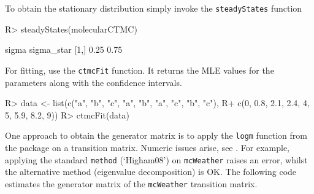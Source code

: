 \documentclass[
  nojss]{jss}
\begin{document}
To obtain the stationary distribution simply invoke the \texttt{steadyStates} function

\begin{CodeChunk}

\begin{CodeInput}
R> steadyStates(molecularCTMC)
\end{CodeInput}

\begin{CodeOutput}
     sigma sigma_star
[1,]  0.25       0.75
\end{CodeOutput}
\end{CodeChunk}

For fitting, use the \texttt{ctmcFit} function. It returns the MLE values for the parameters along with the confidence intervals.

\begin{CodeChunk}

\begin{CodeInput}
R> data <- list(c("a", "b", "c", "a", "b", "a", "c", "b", "c"), 
R+              c(0, 0.8, 2.1, 2.4, 4, 5, 5.9, 8.2, 9))
R> ctmcFit(data)
\end{CodeInput}

\end{CodeChunk}

One approach to obtain the generator matrix is to apply the \texttt{logm} function from the  package on a transition matrix. Numeric issues arise, see \cite{israel2001finding}. For example, applying the standard \texttt{method} (`Higham08') on \texttt{mcWeather} raises an error, whilst the alternative method (eigenvalue decomposition) is OK. The following code estimates the generator matrix of the \texttt{mcWeather} transition matrix.
\end{document}
